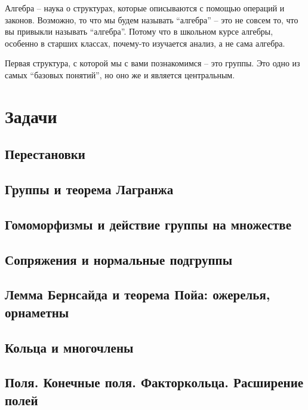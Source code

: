 \documentclass[10pt, twoside]{article}
\begin{document}
\pagestyle{empty}

\newpage

\tableofcontents
\newpage

\setcounter{page}{1}
\pagestyle{fancy}

Алгебра -- наука о структурах, которые описываются с помощью операций и законов. 
Возможно, то что мы будем называть ``алгебра'' -- это не совсем то, что вы привыкли называть ``алгебра''. 
Потому что в школьном курсе алгебры, особенно в старших классах, почему-то изучается анализ, а не сама алгебра.

Первая структура, с которой мы с вами познакомимся -- это группы.
Это одно из самых ``базовых понятий'', но оно же и является центральным. 












\newpage
\renewcommand{\thesubsection}{\roman{subsection}}
\setcounter{subsection}{0}

\section*{Задачи}
\subsection{Перестановки}

\subsection{Группы и теорема Лагранжа}

\subsection{Гомоморфизмы и действие группы на множестве}

\subsection{Сопряжения и нормальные подгруппы}
%
\subsection{Лемма Бернсайда и теорема Пойа: ожерелья, орнаметны}
%
\subsection{Кольца и многочлены}
%
\subsection{Поля. Конечные поля. Факторкольца. Расширение полей} %
%
%
\end{document}
